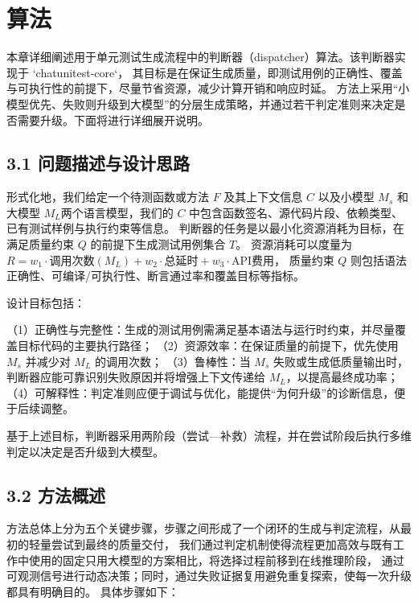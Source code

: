 






\section{算法}

本章详细阐述用于单元测试生成流程中的判断器（dispatcher）算法。该判断器实现于 `chatunitest-core`，
其目标是在保证生成质量，即测试用例的正确性、覆盖与可执行性的前提下，尽量节省资源，减少计算开销和响应时延。
方法上采用“小模型优先、失败则升级到大模型”的分层生成策略，并通过若干判定准则来决定是否需要升级。下面将进行详细展开说明。

\subsection{3.1 问题描述与设计思路}

形式化地，我们给定一个待测函数或方法 $F$ 及其上下文信息 $C$
以及小模型 $M_s$ 和大模型 $M_L$两个语言模型，我们的 $C$ 中包含函数签名、源代码片段、依赖类型、已有测试样例与执行约束等信息。
判断器的任务是以最小化资源消耗为目标，在满足质量约束 $Q$ 的前提下生成测试用例集合 $T$。
资源消耗可以度量为 $R = w_1\cdot\text{调用次数}(M_L) + w_2\cdot\text{总延时} + w_3\cdot\text{API费用}$，
质量约束 $Q$ 则包括语法正确性、可编译/可执行性、断言通过率和覆盖目标等指标。

设计目标包括：

（1）正确性与完整性：生成的测试用例需满足基本语法与运行时约束，并尽量覆盖目标代码的主要执行路径；
（2）资源效率：在保证质量的前提下，优先使用 $M_s$ 并减少对 $M_L$ 的调用次数；
（3）鲁棒性：当 $M_s$ 失败或生成低质量输出时，判断器应能可靠识别失败原因并将增强上下文传递给 $M_L$，以提高最终成功率；
（4）可解释性：判定准则应便于调试与优化，能提供“为何升级”的诊断信息，便于后续调整。 

基于上述目标，判断器采用两阶段（尝试—补救）流程，并在尝试阶段后执行多维判定以决定是否升级到大模型。

\subsection{3.2 方法概述}

方法总体上分为五个关键步骤，步骤之间形成了一个闭环的生成与判定流程，从最初的轻量尝试到最终的质量交付，
我们通过判定机制使得流程更加高效与既有工作中使用的固定只用大模型的方案相比，将选择过程前移到在线推理阶段，
通过可观测信号进行动态决策；同时，通过失败证据复用避免重复探索，使每一次升级都具有明确目的。
具体步骤如下：

